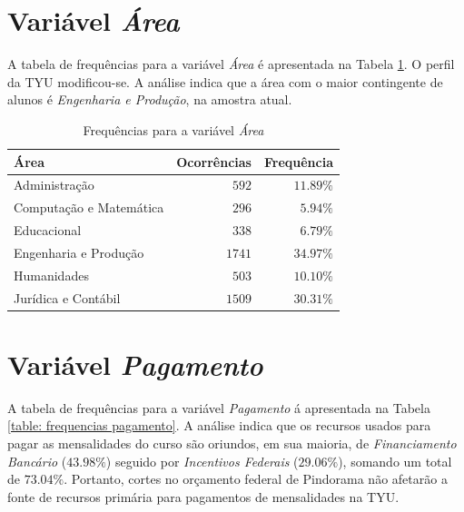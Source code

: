 \documentclass[10pt,a4paper,oneside]{article}
\newcommand{\adm}{Administração\xspace}
\newcommand{\comp}{Computação e Matemática\xspace}
\newcommand{\edu}{Educacional\xspace}
\newcommand{\eng}{Engenharia e Produção\xspace}
\newcommand{\hum}{Humanidades\xspace}
\newcommand{\jur}{Jurídica e Contábil\xspace}
\begin{document}
\section{Variável \textit{Área}}
\label{section:area}

A tabela de frequências para a variável \textit{Área} é apresentada na Tabela \ref{table: frequencias area}. O perfil da TYU modificou-se. A análise indica que a área com o maior contingente de alunos é \textit{\eng}, na amostra atual.

\begin{table}[h]
\small
\centering
\caption{Frequências para a variável \textit{Área}}
\label{table: frequencias area}
\vspace{0.5em}
\begin{tabular}{l r r}
	\toprule
	\textbf{Área} & \textbf{Ocorrências} & \textbf{Frequência} \\
	\midrule
	\adm            & $592$                & $11.89\%$           \\
	\comp           & $296$                & $5.94\%$            \\
	\edu            & $338$                & $6.79\%$            \\
	\eng            & $1741$               & $34.97\%$           \\
	\hum            & $503$                & $10.10\%$           \\
	\jur            & $1509$               & $30.31\%$           \\
	\bottomrule
\end{tabular}
\end{table}

\section{Variável \textit{Pagamento}}
\label{section:pagamento}

A tabela de frequências para a variável \textit{Pagamento} á apresentada na Tabela \ref{table: frequencias pagamento}. A análise indica que os recursos usados para pagar as mensalidades do curso são oriundos, em sua maioria, de \textit{Financiamento Bancário} ($43.98\%$) seguido por \textit{Incentivos Federais} ($29.06\%$), somando um total de $73.04\%$. Portanto, cortes no orçamento federal de Pindorama não afetarão a fonte de recursos primária para pagamentos de mensalidades na TYU.
\end{document}
